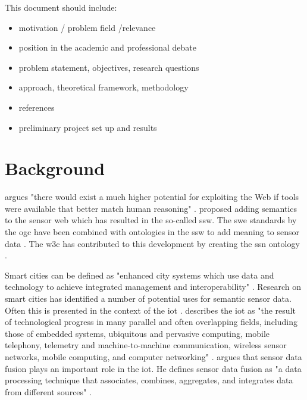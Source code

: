 \iffalse

This document should include:

\begin{itemize} 
\item motivation / problem field /relevance

\item position in the academic and professional debate

\item problem statement, objectives, research questions

\item approach, theoretical framework, methodology

\item references

\item preliminary project set up and results

\end{itemize}

\section{Background}
\cite{LD:Egenhofer} argues "there would exist a much higher potential for exploiting the Web if tools were available that better match human reasoning" \cite[p. 1]{LD:Egenhofer}. \cite{SSW:Sheth} proposed adding semantics to the sensor web which has resulted in the so-called \ac{ssw}. The \ac{swe} standards by the \ac{ogc} have been combined with ontologies in the \ac{ssw}  to add meaning to sensor data \citep{SSW:Pschorr, SSW:Henson}. The \ac{w3c} has contributed to this development by creating the \ac{ssn} ontology \citep{SSW:SSN_incubatorGroup}.

Smart cities can be defined as "enhanced city systems which use data and technology to achieve integrated management and interoperability" \citep[p. 18]{SC:Moir}. Research on smart cities has identified a number of potential uses for semantic sensor data. Often this is presented in the context of the \ac{iot} \citep{IOT:Zanelli, SSW:Perera}. 
\cite{IOT:Fell} describes the \ac{iot} as "the result of technological progress in many parallel and often overlapping fields, including those of embedded systems, ubiquitous and pervasive computing, mobile telephony, telemetry and machine-to-machine communication, wireless sensor networks, mobile computing, and computer networking" \cite[p. 11]{IOT:Fell}. \cite{SSW:Perera} argues that sensor data fusion plays an important role in the \ac{iot}. He defines sensor data fusion as "a data processing technique that associates, combines, aggregates, and integrates data from different sources" \cite[p. 2]{SSW:Perera}. 

